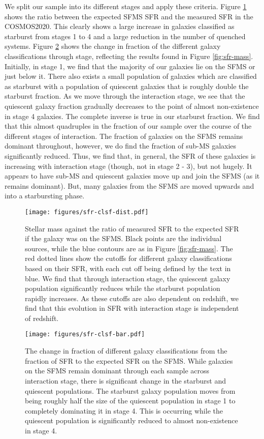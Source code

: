 \documentclass[fleqn,usenatbib]{mnras}
\begin{document}
\noindent We split our sample into its different stages and apply these criteria. Figure \ref{fig:sfr-clsf} shows the ratio between the expected SFMS SFR and the measured SFR in the COSMOS2020. This clearly shows a large increase in galaxies classified as starburst from stages 1 to 4 and a large reduction in the number of quenched systems. Figure \ref{fig:sfr-clsf-bar} shows the change in fraction of the different galaxy classifications through stage, reflecting the results found in Figure \ref{fig:sfr-mass}. Initially, in stage 1, we find that the majority of our galaxies lie on the SFMS or just below it. There also exists a small population of galaxies which are classified as starburst with a population of quiescent galaxies that is roughly double the starburst fraction. As we move through the interaction stage, we see that the quiescent galaxy fraction gradually decreases to the point of almost non-existence in stage 4 galaxies. The complete inverse is true in our starburst fraction. We find that this almost quadruples in the fraction of our sample over the course of the different stages of interaction. The fraction of galaxies on the SFMS remains dominant throughout, however, we do find the fraction of sub-MS galaxies significantly reduced. Thus, we find that, in general, the SFR of these galaxies is increasing with interaction stage (though, not in stage 2 - 3), but not hugely. It appears to have sub-MS and quiescent galaxies move up and join the SFMS (as it remains dominant). But, many galaxies from the SFMS are moved upwards and into a starbursting phase.

\begin{figure}
    \centering
    \texttt{[image: figures/sfr-clsf-dist.pdf]}
    \caption{Stellar mass against the ratio of measured SFR to the expected SFR if the galaxy was on the SFMS. Black points are the individual sources, while the blue contours are as in Figure \ref{fig:sfr-mass}. The red dotted lines show the cutoffs for different galaxy classifications based on their SFR, with each cut off being defined by the text in blue. We find that through interaction stage, the quiescent galaxy population significantly reduces while the starburst population rapidly increases. As these cutoffs are also dependent on redshift, we find that this evolution in SFR with interaction stage is independent of redshift.}
    \label{fig:sfr-clsf}
\end{figure}

\begin{figure}
    \centering
    \texttt{[image: figures/sfr-clsf-bar.pdf]}
    \caption{The change in fraction of different galaxy classifications from the fraction of SFR to the expected SFR on the SFMS. While galaxies on the SFMS remain dominant through each sample across interaction stage, there is significant change in the starburst and quiescent populations. The starburst galaxy population moves from being roughly half the size of the quiescent population in stage 1 to completely dominating it in stage 4. This is occurring while the quiescent population is significantly reduced to almost non-existence in stage 4.}
    \label{fig:sfr-clsf-bar}
\end{figure}
\end{document}
